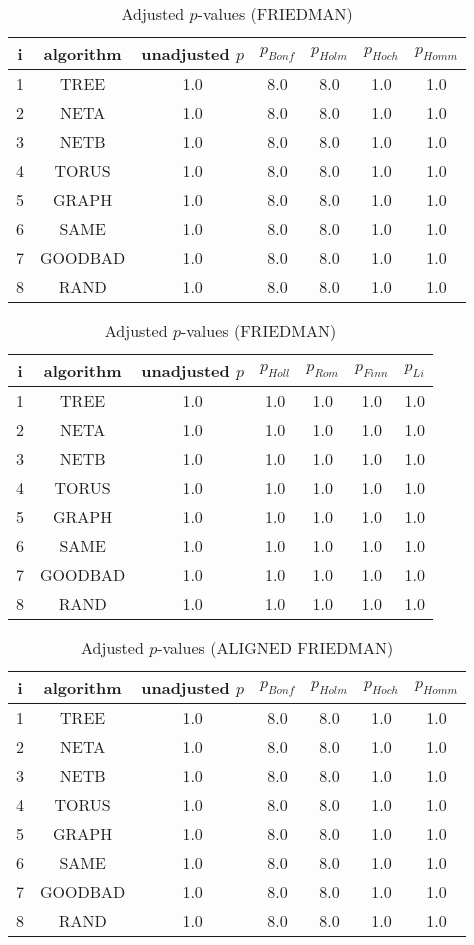 \documentclass[a4paper,10pt]{article}
\begin{document}
\begin{landscape}
\begin{table}[!htp]
\centering\scriptsize
\caption{Adjusted $p$-values (FRIEDMAN)}
\begin{tabular}{ccccccc}
i&algorithm&unadjusted $p$&$p_{Bonf}$&$p_{Holm}$&$p_{Hoch}$&$p_{Homm}$\\
\hline
1& TREE&1.0&8.0&8.0&1.0&1.0\\
2& NETA&1.0&8.0&8.0&1.0&1.0\\
3& NETB&1.0&8.0&8.0&1.0&1.0\\
4& TORUS&1.0&8.0&8.0&1.0&1.0\\
5& GRAPH&1.0&8.0&8.0&1.0&1.0\\
6& SAME&1.0&8.0&8.0&1.0&1.0\\
7& GOODBAD&1.0&8.0&8.0&1.0&1.0\\
8& RAND&1.0&8.0&8.0&1.0&1.0\\
\hline
\end{tabular}
\end{table}

\begin{table}[!htp]
\centering\scriptsize
\caption{Adjusted $p$-values (FRIEDMAN)}
\begin{tabular}{ccccccc}
i&algorithm&unadjusted $p$&$p_{Holl}$&$p_{Rom}$&$p_{Finn}$&$p_{Li}$\\
\hline
1& TREE&1.0&1.0&1.0&1.0&1.0\\
2& NETA&1.0&1.0&1.0&1.0&1.0\\
3& NETB&1.0&1.0&1.0&1.0&1.0\\
4& TORUS&1.0&1.0&1.0&1.0&1.0\\
5& GRAPH&1.0&1.0&1.0&1.0&1.0\\
6& SAME&1.0&1.0&1.0&1.0&1.0\\
7& GOODBAD&1.0&1.0&1.0&1.0&1.0\\
8& RAND&1.0&1.0&1.0&1.0&1.0\\
\hline
\end{tabular}
\end{table}


\newpage

\begin{table}[!htp]
\centering\scriptsize
\caption{Adjusted $p$-values (ALIGNED FRIEDMAN)}
\begin{tabular}{ccccccc}
i&algorithm&unadjusted $p$&$p_{Bonf}$&$p_{Holm}$&$p_{Hoch}$&$p_{Homm}$\\
\hline
1& TREE&1.0&8.0&8.0&1.0&1.0\\
2& NETA&1.0&8.0&8.0&1.0&1.0\\
3& NETB&1.0&8.0&8.0&1.0&1.0\\
4& TORUS&1.0&8.0&8.0&1.0&1.0\\
5& GRAPH&1.0&8.0&8.0&1.0&1.0\\
6& SAME&1.0&8.0&8.0&1.0&1.0\\
7& GOODBAD&1.0&8.0&8.0&1.0&1.0\\
8& RAND&1.0&8.0&8.0&1.0&1.0\\
\hline
\end{tabular}
\end{table}


\end{landscape}
\end{document}

